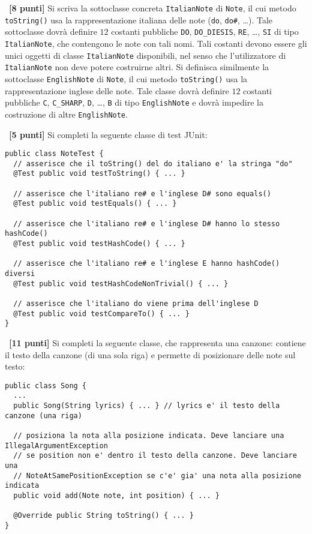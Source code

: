 \documentclass[12pt]{article}
\newcounter{esnu}
\newenvironment{esercizio}{\medskip \noindent {\bf Esercizio\addtocounter{esnu}{1} \arabic{esnu}}}{}
\begin{document}
\begin{esercizio}~\textbf{[8 punti]}
  Si scriva la sottoclasse concreta \texttt{ItalianNote} di \texttt{Note},
  il cui metodo \texttt{toString()} usa la rappresentazione italiana delle note (\texttt{do}, \texttt{do\#}, \ldots).
  Tale sottoclasse dovr\`a definire $12$ costanti pubbliche \texttt{DO},
  \texttt{DO\_DIESIS}, \texttt{RE}, \ldots, \texttt{SI} di tipo \texttt{ItalianNote}, che contengono le note
  con tali nomi. Tali costanti devono essere gli unici oggetti
  di classe \texttt{ItalianNote} disponibili, nel senso che l'utilizzatore di \texttt{ItalianNote}
  non deve potere costruirne altri. Si definisca similmente la sottoclasse \texttt{EnglishNote} di
  \texttt{Note}, il cui metodo \texttt{toString()} usa la rappresentazione inglese delle note.
  Tale classe dovr\`a definire $12$ costanti pubbliche \texttt{C}, \texttt{C\_SHARP}, \texttt{D}, \ldots,
  \texttt{B} di tipo \texttt{EnglishNote} e dovr\`a impedire la costruzione di altre \texttt{EnglishNote}.
\end{esercizio}

\begin{esercizio}~\textbf{[5 punti]}
  Si completi la seguente classe di test JUnit:
\begin{lstlisting}
public class NoteTest {
  // asserisce che il toString() del do italiano e' la stringa "do"
  @Test public void testToString() { ... }

  // asserisce che l'italiano re# e l'inglese D# sono equals()
  @Test public void testEquals() { ... }

  // asserisce che l'italiano re# e l'inglese D# hanno lo stesso hashCode()
  @Test public void testHashCode() { ... }

  // asserisce che l'italiano re# e l'inglese E hanno hashCode() diversi
  @Test public void testHashCodeNonTrivial() { ... }

  // asserisce che l'italiano do viene prima dell'inglese D
  @Test public void testCompareTo() { ... }
}
\end{lstlisting}
\end{esercizio}

\begin{esercizio}~\textbf{[11 punti]}
  Si completi la seguente classe, che rappresenta una canzone: contiene il testo
  della canzone (di una sola riga) e permette di posizionare delle note sul testo:
\begin{lstlisting}
public class Song {
  ...
  public Song(String lyrics) { ... } // lyrics e' il testo della canzone (una riga)

  // posiziona la nota alla posizione indicata. Deve lanciare una IllegalArgumentException
  // se position non e' dentro il testo della canzone. Deve lanciare una
  // NoteAtSamePositionException se c'e' gia' una nota alla posizione indicata
  public void add(Note note, int position) { ... }

  @Override public String toString() { ... }
}
\end{lstlisting}
\end{esercizio}
\end{document}
